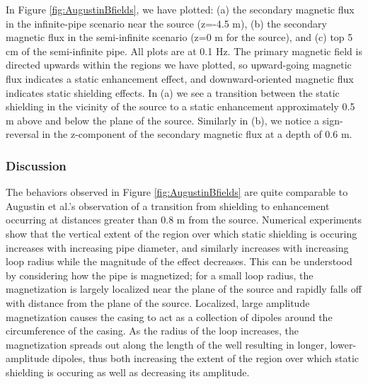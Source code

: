 \documentclass[preprint,review,3p,times,onecolumn,authoryear]{elsarticle}
\begin{document}
In Figure \ref{fig:AugustinBfields}, we have plotted: (a) the secondary magnetic flux in the infinite-pipe scenario near the source (z=-4.5 m), (b) the secondary magnetic flux in the semi-infinite scenario (z=0 m for the source), and (c) top 5 cm of the semi-infinite pipe. All plots are at 0.1 Hz. The primary magnetic field is directed upwards within the regions we have plotted, so upward-going magnetic flux indicates a static enhancement effect, and downward-oriented magnetic flux indicates static shielding effects. In (a) we see a transition between the static shielding in the vicinity of the source to a static enhancement approximately 0.5 m above and below the plane of the source. Similarly in (b), we notice a sign-reversal in the z-component of the secondary magnetic flux at a depth of 0.6 m.

\subsubsection{Discussion}
The behaviors observed in Figure \ref{fig:AugustinBfields} are quite comparable to Augustin et al.'s observation of a transition from shielding to enhancement occurring at distances greater than 0.8 m from the source. Numerical experiments show that the vertical extent of the region over which static shielding is occuring increases with increasing pipe diameter, and similarly increases with increasing loop radius while the magnitude of the effect decreases. This can be understood by considering how the pipe is magnetized; for a small loop radius, the magnetization is largely localized near the plane of the source and rapidly falls off with distance from the plane of the source. Localized, large amplitude magnetization causes the casing to act as a collection of dipoles around the circumference of the casing. As the radius of the loop increases, the magnetization spreads out along the length of the well resulting in longer, lower-amplitude dipoles, thus both increasing the extent of the region over which static shielding is occuring as well as decreasing its amplitude.



\end{document}
